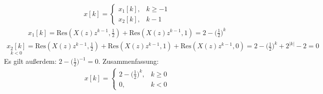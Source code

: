 \documentclass[11pt,a4paper,DIV=12]{scrartcl}
\begin{document}
\begin{align}
	x[k]=
	\begin{cases}
		x_1[k], &k\geq-1 \\
		x_2[k], &k-1
	\end{cases}
\end{align}
\begin{align}
	x_1[k]=\mathrm{Res}(X(z)z^{k-1},\frac{1}{2})+\mathrm{Res}(X(z)z^{k-1},1)=2-\bigg (\frac{1}{2}\bigg)^k
\end{align}
\begin{align}
	\underset{k<0}{x_2[k]}=\mathrm{Res}(X(z)z^{k-1},\frac{1}{2})+\mathrm{Res}(X(z)z^{k-1},1)+\mathrm{Res}(X(z)z^{k-1},0)=2-\bigg (\frac{1}{2})^k+2^{|k|}-2=0
\end{align}
Es gilt außerdem: $2-\bigg (\frac{1}{2}\bigg)^{-1}=0$.
Zusammenfassung:
\begin{align}
	x[k]=
	\begin{cases}
		2-\bigg (\frac{1}{2}\bigg)^k, &k\geq 0 \\
		0, &k< 0
	\end{cases}
\end{align}
\end{document}
